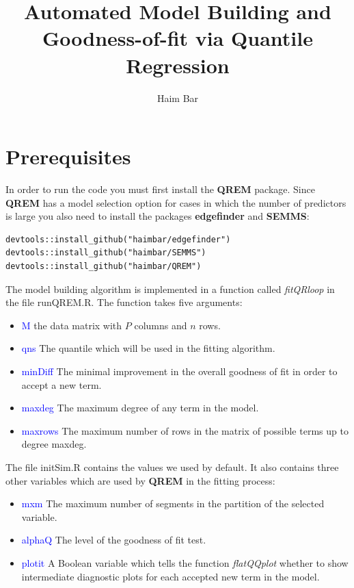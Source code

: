 \documentclass[a4paper,12pt]{article}
\title{Automated Model Building and Goodness-of-fit via Quantile Regression}
\author{Haim Bar}
\newcommand{\func}[1]{\textit{#1}}
\newcommand{\pkg}[1]{\textbf{#1}}
\begin{document}
\maketitle
{}

\section{Prerequisites}
In order to run the code you must first install the \pkg{QREM} package. Since \pkg{QREM} has a model selection option for cases in which the number of predictors is large you also need to install the packages \pkg{edgefinder} and \pkg{SEMMS}:

\begin{Verbatim}
devtools::install_github("haimbar/edgefinder")
devtools::install_github("haimbar/SEMMS")
devtools::install_github("haimbar/QREM")
\end{Verbatim}

The model building algorithm is implemented in a function called \func{fitQRloop} in the file runQREM.R. The function takes five arguments:
\begin{itemize}
 \item \textcolor{blue}{M} the data matrix with $P$ columns and $n$ rows.
 \item \textcolor{blue}{qns} The quantile which will be used in the fitting algorithm.
 \item \textcolor{blue}{minDiff} The minimal improvement in the overall goodness of fit in order to accept a new term.
 \item \textcolor{blue}{maxdeg} The maximum degree of any term in the model.
 \item \textcolor{blue}{maxrows} The maximum number of rows in the matrix of possible terms up to degree maxdeg.
\end{itemize}
The file initSim.R contains the values we used by default. It also contains three other variables which are used by \pkg{QREM} in the fitting process:
\begin{itemize}
 \item \textcolor{blue}{mxm} The maximum number of segments in the partition of the selected variable.
 \item \textcolor{blue}{alphaQ} The level of the goodness of fit test.
 \item \textcolor{blue}{plotit} A Boolean variable which tells the function \func{flatQQplot} whether to show intermediate diagnostic plots for each accepted new term in the model.
\end{itemize}
\end{document}
